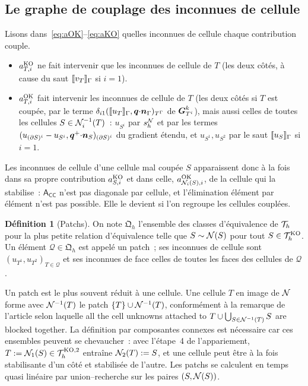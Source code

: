 \documentclass[11pt,a4paper]{article}
\theoremstyle{definition}
\newtheorem{definition}{Définition}
\theoremstyle{remark}
\newcommand{\patch}{\mathcal{Q}}
\newcommand{\patches}{\mathfrak{Q}_h}
\newcommand{\A}{\mathsf{A}}
\begin{document}
\subsection{Le graphe de couplage des inconnues de cellule}

Lisons dans~\eqref{eq:aOK}--\eqref{eq:aKO} quelles inconnues de cellule chaque contribution couple.
\begin{itemize}[leftmargin=*]
\item $a^{\textup{KO}}_{T,i}$ ne fait intervenir que les inconnues de cellule de $T$
(les deux côtés, à cause du saut $\llbracket v_{T} \rrbracket_\Gamma$ si $i=1$).
\item $a^{\textup{OK}}_{T,i}$ fait intervenir les inconnues de cellule de $T$ (les deux côtés
si $T$ est coupée, par le terme $\delta_{i1}(\llbracket u_{T} \rrbracket_\Gamma,\boldsymbol{q}{\cdot}\boldsymbol{n}_{\Gamma})_{T^\Gamma}$ de $\boldsymbol{G}_{T^i}^k$), mais aussi celles de
toutes les cellules $S\in\mathcal{N}_i^{-1}(T)$~: $u_{S^i}$ par $s_h^{\mathcal{N}}$ et par les termes
$(u_{(\partial S)^{i}}-u_{S^i},\boldsymbol{q}^+{\cdot}\boldsymbol{n}_{S})_{(\partial S)^{i}}$ du gradient étendu, et $u_{S^1},u_{S^2}$ par le saut
$\llbracket u_S \rrbracket_\Gamma$ si $i=1$.
\end{itemize}
Les inconnues de cellule d'une cellule mal coupée $S$ apparaissent donc à la fois dans sa propre
contribution $a^{\textup{KO}}_{S,i}$ et dans celle, $a^{\textup{OK}}_{\mathcal{N}_i(S),i}$, de la cellule qui la
stabilise~: $\A_{\mathsf{CC}}$ n'est pas diagonale par cellule, et l'élimination élément par élément
n'est pas possible. Elle le devient si l'on regroupe les cellules couplées.

\begin{definition}[Patchs]
On note $\patches$ l'ensemble des classes d'équivalence de $\mathcal{T}_h$ pour la plus petite relation
d'équivalence telle que $S\sim\mathcal{N}(S)$ pour tout $S\in\mathcal{T}_h^{\textup{KO}}$. Un élément $\patch\in\patches$ est
appelé un patch~; ses inconnues de cellule sont $(u_{T^1},u_{T^2})_{T\in\patch}$ et ses inconnues
de face celles de toutes les faces des cellules de $\patch$.
\end{definition}

Un patch est le plus souvent réduit à une cellule. Une cellule $T$ en image de $\mathcal{N}$ forme avec
$\mathcal{N}^{-1}(T)$ le patch $\{T\}\cup\mathcal{N}^{-1}(T)$, conformément à la remarque de l'article selon laquelle
\og all the cell unknowns attached to $T\cup\bigcup_{S\in\mathcal{N}^{-1}(T)}S$ are blocked together\fg.
La définition par composantes connexes est nécessaire car ces ensembles peuvent se chevaucher~:
avec l'étape~4 de l'appariement, $T:=\mathcal{N}_1(S)\in\mathcal{T}_h^{\textup{KO},2}$ entraîne $\mathcal{N}_2(T):=S$, et une cellule
peut être à la fois stabilisante d'un côté et stabilisée de l'autre. Les patchs se calculent en
temps quasi linéaire par union--recherche sur les paires $(S,\mathcal{N}(S))$.
\end{document}
